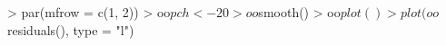 \begin{Schunk}
\begin{Sinput}
> par(mfrow = c(1, 2))
> oo$pch <- 20
> oo$smooth()
> oo$plot()
> plot(oo$residuals(), type = "l")
\end{Sinput}
\end{Schunk}
